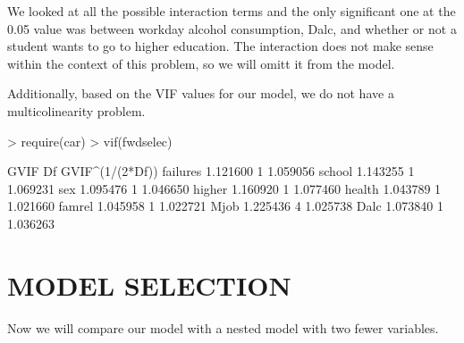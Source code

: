 \documentclass{article}
\begin{document}
We looked at all the possible interaction terms and the only significant one at the 0.05 value was between workday alcohol consumption, Dalc, and whether or not a student wants to go to higher education. The interaction does not make sense within the context of this problem, so we will omitt it from the model. 

Additionally, based on the VIF values for our model, we do not have a multicolinearity problem. 
\begin{Schunk}
\begin{Sinput}
> require(car)
> vif(fwdselec)
\end{Sinput}
\begin{Soutput}
             GVIF Df GVIF^(1/(2*Df))
failures 1.121600  1        1.059056
school   1.143255  1        1.069231
sex      1.095476  1        1.046650
higher   1.160920  1        1.077460
health   1.043789  1        1.021660
famrel   1.045958  1        1.022721
Mjob     1.225436  4        1.025738
Dalc     1.073840  1        1.036263
\end{Soutput}
\end{Schunk}


\section{MODEL SELECTION}

Now we will compare our model with a nested model with two fewer variables.
\end{document}
